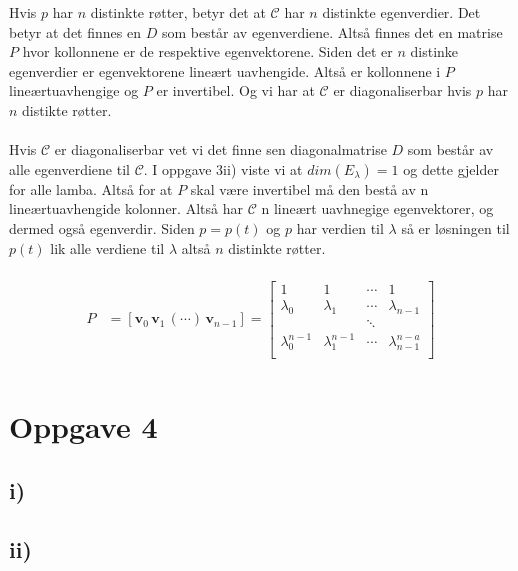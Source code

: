 \documentclass[a4paper, norsk, twoside, 10pt]{article}
\begin{document}
\begin{flushleft}
  Hvis $p$ har $n$ distinkte røtter, betyr det at $\mathcal{C}$ har $n$ distinkte egenverdier. Det betyr at det finnes en $D$ som består av egenverdiene. Altså finnes det en matrise $P$ hvor kollonnene er de respektive egenvektorene. Siden det er $n$ distinke egenverdier er egenvektorene lineært uavhengide. Altså er kollonnene i $P$ lineærtuavhengige og $P$ er invertibel. Og vi har at $\mathcal{C}$ er diagonaliserbar hvis $p$ har $n$ distikte røtter.
  \\ \ \\
  Hvis $\mathcal{C}$ er diagonaliserbar vet vi det finne sen diagonalmatrise $D$ som består av alle egenverdiene til $\mathcal{C}$. I oppgave 3ii) viste vi at $dim(E_{\lambda}) = 1$ og dette gjelder for alle lamba. Altså for at $P$ skal være invertibel må den bestå av n lineærtuavhengide kolonner. Altså har $\mathcal{C}$ n lineært uavhnegige egenvektorer, og dermed også egenverdir. Siden $p = p(t)$ og $p$ har verdien til $\lambda$ så er løsningen til $p(t)$ lik alle verdiene til $\lambda$ altså $n$ distinkte røtter.
  \\ \ \\
  \begin{align*}
    P &= [\mathbf{v}_{0} \, \mathbf{v}_{1} \, (\cdots) \, \mathbf{v}_{n-1} ]  =
    \begin{bmatrix}
      1 & 1  & \cdots & 1 \\
      \lambda_0 & \lambda_1 & \cdots & \lambda_{n-1} \\
      & & \ddots& \\
      \lambda^{n-1}_{0} & \lambda^{n-1}_{1} & \cdots & \lambda^{n-a}_{n-1} \\
    \end{bmatrix}\\
  \end{align*}

\newpage
  \section*{Oppgave 4}
  \subsection*{i)}

  
\newpage
  \subsection*{ii)}

  
\newpage


\end{flushleft}
\end{document}
